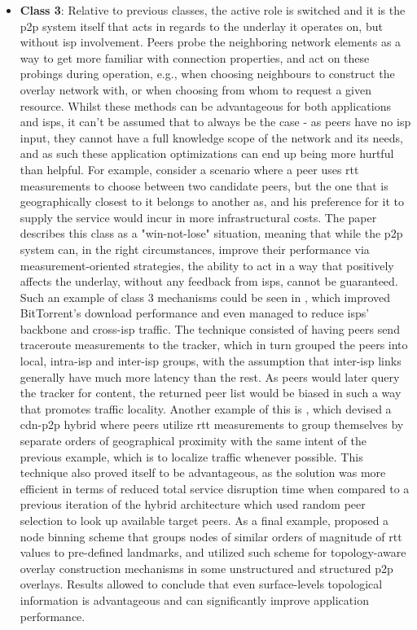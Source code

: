 \begin{itemize}
        \item \textbf{Class 3}:
            Relative to previous classes, the active role is switched and it is the \gls{p2p} system itself that acts in regards to the underlay it operates on, but without \gls{isp} involvement.
            Peers probe the neighboring network elements as a way to get more familiar with connection properties, and act on these probings during operation, e.g., when choosing neighbours to construct the overlay network with, or when choosing from whom to request a given resource.
            Whilst these methods can be advantageous for both applications and \glspl{isp}, it can't be assumed that to always be the case - as peers have no \gls{isp} input, they cannot have a full knowledge scope of the network and its needs, and as such these application optimizations can end up being more hurtful than helpful.
            For example, consider a scenario where a peer uses \gls{rtt} measurements to choose between two candidate peers, but the one that is geographically closest to it belongs to another \gls{as}, and his preference for it to supply the service would incur in more infrastructural costs.
            The paper describes this class as a "win-not-lose" situation, meaning that while the \gls{p2p} system can, in the right circumstances, improve their performance via measurement-oriented strategies, the ability to act in a way that positively affects the underlay, without any feedback from \glspl{isp}, cannot be guaranteed.
            Such an example of class 3 mechanisms could be seen in \cite{qin2009}, which improved BitTorrent's download performance and even managed to reduce \glspl{isp}' backbone and cross-\gls{isp} traffic.
            The technique consisted of having peers send traceroute measurements to the tracker, which in turn grouped the peers into local, intra-\gls{isp} and inter-\gls{isp} groups, with the assumption that inter-\gls{isp} links generally have much more latency than the rest.
            As peers would later query the tracker for content, the returned peer list would be biased in such a way that promotes traffic locality.
            Another example of this is \cite{kim2011}, which devised a \gls{cdn}-\gls{p2p} hybrid where peers utilize \gls{rtt} measurements to group themselves by separate orders of geographical proximity with the same intent of the previous example, which is to localize traffic whenever possible.
            This technique also proved itself to be advantageous, as the solution was more efficient in terms of reduced total service disruption time when compared to a previous iteration of the hybrid architecture which used random peer selection to look up available target peers.
            As a final example, \cite{topology-aware-p2p-server-selection} proposed a node binning scheme that groups nodes of similar orders of magnitude of \gls{rtt} values to pre-defined landmarks, and utilized such scheme for topology-aware overlay construction mechanisms in some unstructured and structured \gls{p2p} overlays.
            Results allowed to conclude that even surface-levels topological information is advantageous and can significantly improve application performance.


\end{itemize}
